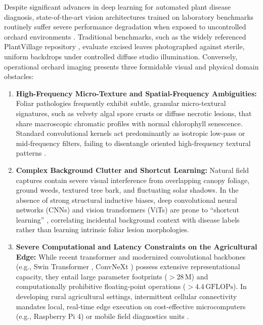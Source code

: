 Despite significant advances in deep learning for automated plant disease diagnosis, state-of-the-art vision architectures trained on laboratory benchmarks routinely suffer severe performance degradation when exposed to uncontrolled orchard environments \cite{barbedo2019plant}. Traditional benchmarks, such as the widely referenced PlantVillage repository \cite{hughes2015open}, evaluate excised leaves photographed against sterile, uniform backdrops under controlled diffuse studio illumination. Conversely, operational orchard imaging presents three formidable visual and physical domain obstacles:
\begin{enumerate}
    \item \textbf{High-Frequency Micro-Texture and Spatial-Frequency Ambiguities:} Foliar pathologies frequently exhibit subtle, granular micro-textural signatures, such as velvety algal spore crusts or diffuse necrotic lesions, that share macroscopic chromatic profiles with normal chlorophyll senescence. Standard convolutional kernels act predominantly as isotropic low-pass or mid-frequency filters, failing to disentangle oriented high-frequency textural patterns \cite{wang2021gabor}.
    \item \textbf{Complex Background Clutter and Shortcut Learning:} Natural field captures contain severe visual interference from overlapping canopy foliage, ground weeds, textured tree bark, and fluctuating solar shadows. In the absence of strong structural inductive biases, deep convolutional neural networks (CNNs) and vision transformers (ViTs) are prone to ``shortcut learning'' \cite{singh2020deep}, correlating incidental background context with disease labels rather than learning intrinsic foliar lesion morphologies.
    \item \textbf{Severe Computational and Latency Constraints on the Agricultural Edge:} While recent transformer and modernized convolutional backbones (e.g., Swin Transformer \cite{liu2021swin}, ConvNeXt \cite{liu2022convnet}) possess extensive representational capacity, they entail large parameter footprints ($>28\,\text{M}$) and computationally prohibitive floating-point operations ($>4.4\,\text{GFLOPs}$). In developing rural agricultural settings, intermittent cellular connectivity mandates local, real-time edge execution on cost-effective microcomputers (e.g., Raspberry Pi 4) or mobile field diagnostics units \cite{ahmed2022field}.
\end{enumerate}

